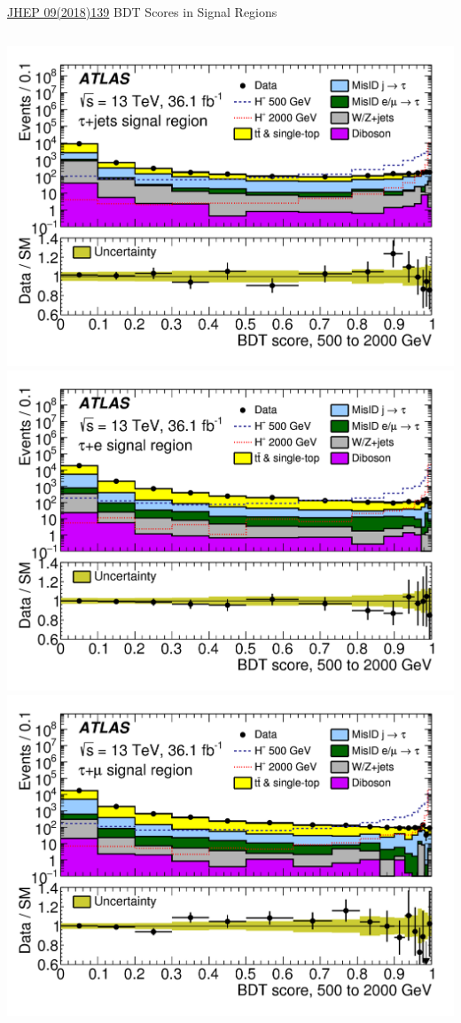 \documentclass[aspectratio=169,xcolor=table]{beamer}
\begin{document}
\begin{frame}{\href{https://link.springer.com/article/10.1007/JHEP09(2018)139}{JHEP 09(2018)139} BDT Scores in Signal Regions}
\begin{columns}
        \includegraphics[height=.24\textheight,keepaspectratio=true]{taujet_SR_2018/taujet_SR_500to2000_2018.png}
        \includegraphics[height=.24\textheight,keepaspectratio=true]{tauel_SR_2018/tauel_SR_500to2000_2018.png}
        \includegraphics[height=.24\textheight,keepaspectratio=true]{taumu_SR_2018/taumu_SR_500to2000_2018.png}
      \end{columns}
    \end{frame}
\end{document}
